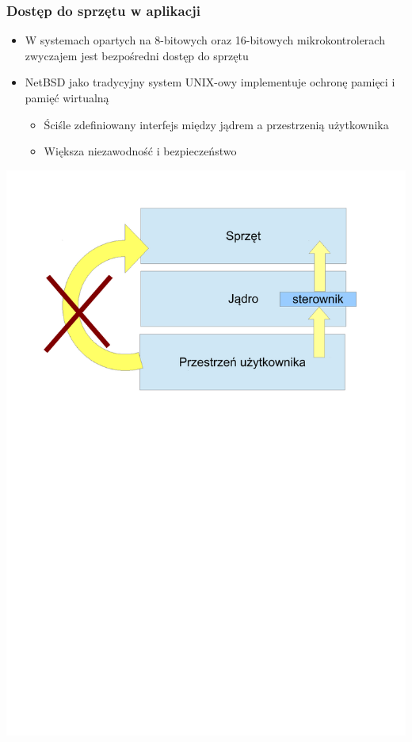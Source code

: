 \documentclass[dvipsnames,table]{beamer}
\begin{document}
\begin{frame}
\frametitle{Dostęp do sprzętu w aplikacji}
\begin{itemize}
	\item W systemach opartych na 8-bitowych oraz 16-bitowych mikrokontrolerach zwyczajem jest bezpośredni dostęp do sprzętu
	\item NetBSD jako tradycyjny system UNIX-owy implementuje ochronę pamięci i pamięć wirtualną
	\begin{itemize}
		\item Ściśle zdefiniowany interfejs między jądrem a przestrzenią użytkownika
		\item Większa niezawodność i bezpieczeństwo
	\end{itemize}
\end{itemize}
\begin{center}
\includegraphics[scale=0.33]{img_hwaccess.pdf}
\end{center}
\end{frame}
\end{document}

